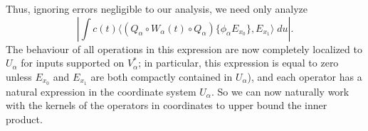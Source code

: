Thus, ignoring errors negligible to our analysis, we need only analyze
%
\[ \left| \int c(t) \big\langle (Q_\alpha \circ W_\alpha(t) \circ Q_\alpha) \{ \phi_\alpha E_{x_0} \}, E_{x_1} \big\rangle\; du \right|. \]
%
The behaviour of all operations in this expression are now completely localized to $U_\alpha$ for inputs supported on $V^*_\alpha$; in particular, this expression is equal to zero unless $E_{x_0}$ and $E_{x_1}$ are both compactly contained in $U_\alpha$), and each operator has a natural expression in the coordinate system $U_\alpha$. So we can now naturally work with the kernels of the operators in coordinates to upper bound the inner product.


